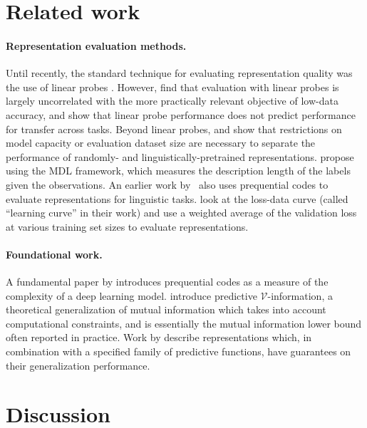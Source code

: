 \section{Related work}

\paragraph{Representation evaluation methods.}
Until recently, the standard technique for evaluating representation quality was the use of linear probes \citep{Kiros2015SkipThoughtV,Hill2016LearningDR,Oord2018RepresentationLW,Chen2020ASF}.
However, \citet{Hnaff2020DataEfficientIR} find that evaluation with linear probes is largely uncorrelated with the more practically relevant objective of low-data accuracy, and \citet{resnick2019probing} show that linear probe performance does not predict performance for transfer across tasks.
Beyond linear probes, \citet{Zhang2018LanguageMT} and \citet{Hewitt2019DesigningProbes} show that restrictions on model capacity or evaluation dataset size are necessary to separate the performance of randomly- and linguistically-pretrained representations.
\citet{Voita2020InformationTheoreticPW} propose using the MDL framework, which
measures the description length of the labels given the observations.
An earlier work by~\citet{Yogatama2019LinguisticIntel} also uses prequential codes to evaluate representations for linguistic tasks.
\citet{Talmor2019oLMpics} look at the loss-data curve (called ``learning curve'' in their work) and use a weighted average of the validation loss at various training set sizes to evaluate representations.

\paragraph{Foundational work.}
A fundamental paper by \citet{Blier2018TheDL} introduces prequential codes as a measure of the complexity of a deep learning model.
\citet{Xu2020ATheory} introduce predictive $\mathcal{V}$-information, a theoretical generalization of mutual information which takes into account computational constraints,
and is essentially the mutual information lower bound often reported in practice.
Work by \citet{Dubois2020LearningOR} describe representations which, in combination with a specified family of predictive functions, have guarantees on their generalization performance.


\section{Discussion}

